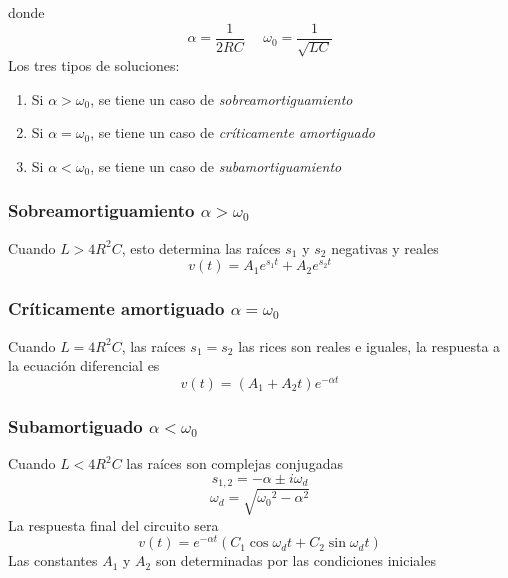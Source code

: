 \documentclass[twocolumn]{IEEEtran}
\begin{document}
\noindent
donde
\begin{equation}
 \alpha  = \frac{1}{{2RC}}\ \ \ \ \ \ {\omega _0} = \frac{1}{{\sqrt {LC} }}
\end{equation}
\noindent
Los tres tipos de soluciones:
\begin{enumerate}
 \item Si $\alpha > \omega _0$, se tiene un caso de \textit{sobreamortiguamiento}
 \item Si $\alpha = \omega _0$, se tiene un caso de \textit{críticamente amortiguado}
 \item Si $\alpha < \omega _0$, se tiene un caso de \textit{subamortiguamiento}
\end{enumerate}

\subsubsection*{Sobreamortiguamiento $\alpha > \omega _0$}
\noindent
Cuando $L > 4{R^{2} C}$, esto determina las raíces $s_1$ y $s_2$ negativas y reales
\begin{equation}
 v(t) = A_1{e ^{s_1 t}} + A_2{e ^{s_2 t}}
\end{equation}

\subsubsection*{Críticamente amortiguado $\alpha = \omega _0$}
\noindent
Cuando $L = 4{R^{2}C}$, las raíces $s_1=s_2$ las rices son reales e iguales, la respuesta a la ecuación diferencial es
\begin{equation}
 v(t) = ({A_1} + {A_2}t){e ^{-\alpha t}}
\end{equation}

\subsubsection*{Subamortiguado $\alpha < \omega _0$}
\noindent
Cuando $L < 4{R^{2}C}$ las raíces son complejas conjugadas
\begin{equation}
 s_{1,2} = -\alpha \pm i \omega _d
\end{equation}
\noindent
\begin{equation}
 \omega _d = \sqrt {{\omega _0}^2 - {\alpha ^2}}
\end{equation}
\noindent
La respuesta final del circuito sera
\begin{equation}
 v(t) = {e^{ - \alpha t}}\left( {{C_1}\cos {\omega _d}t + {C_2}\sin {\omega _d}t} \right)
\end{equation}
\noindent
Las constantes $A_1$ y $A_2$ son determinadas por las condiciones iniciales
\end{document}

